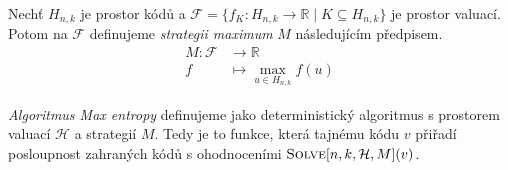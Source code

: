 \begin{definice}\label{defstrategiemaximum}
    Nechť $H_{n,k}$ je prostor kódů a $\mathcal{F} = \{f_K\colon H_{n,k} \to \mathbb{R} \mid K \subseteq H_{n,k}\}$ je prostor valuací. Potom na $\mathcal{F}$ definujeme \emph{strategii maximum} $M$ následujícím předpisem.
    \begin{align*}
        M \colon \mathcal{F} &\to \mathbb{R} \\
        f &\mapsto \max_{u\in H_{n,k}} f(u)
    \end{align*}
\end{definice}


\begin{definice}
    \emph{Algoritmus Max entropy} definujeme jako deterministický algoritmus s prostorem valuací $\mathcal{H}$ a strategií $M$. Tedy je to funkce, která tajnému kódu $v$ přiřadí posloupnost zahraných kódů s ohodnoceními $\textsc{Solve}[n, k, \mathcal{H}, M](v)$.
\end{definice}


